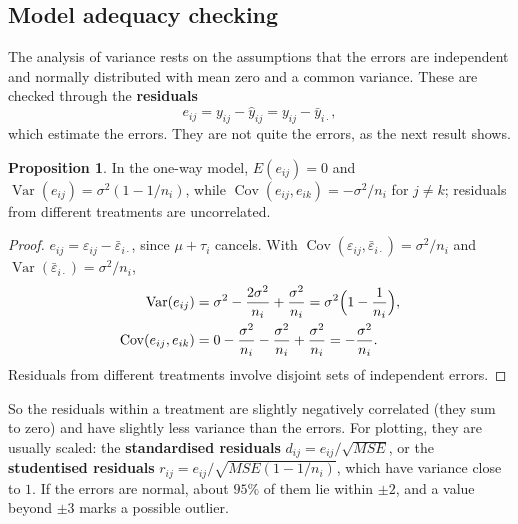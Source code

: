 \documentclass[11pt,a4paper]{article}
\numberwithin{equation}{section}
\DeclareMathOperator{\Var}{Var}
\DeclareMathOperator{\Cov}{Cov}
\theoremstyle{definition}
\newtheorem{prop}[thm]{Proposition}
\begin{document}
\subsection{Model adequacy checking}
The analysis of variance rests on the assumptions that the errors are independent and normally distributed with mean zero and a common
variance. These are checked through the \textbf{residuals}
\[
e_{ij} = y_{ij} - \hat y_{ij} = y_{ij} - \bar y_{i\cdot} ,
\]
which estimate the errors. They are not quite the errors, as the next result shows.

\begin{prop}\label{prop:residual-var}
In the one-way model, $E(e_{ij}) = 0$ and $\Var(e_{ij}) = \sigma^2(1 - 1/n_i)$, while $\Cov(e_{ij}, e_{ik}) = -\sigma^2/n_i$ for $j \ne k$; residuals from different treatments are
uncorrelated.
\end{prop}

\begin{proof}
$e_{ij} = \varepsilon_{ij} - \bar\varepsilon_{i\cdot}$, since $\mu + \tau_i$ cancels. With $\Cov(\varepsilon_{ij}, \bar\varepsilon_{i\cdot}) = \sigma^2/n_i$ and $\Var(\bar\varepsilon_{i\cdot}) = \sigma^2/n_i$,
\begin{align*}
\Var(e_{ij}) &= \sigma^2 - \frac{2\sigma^2}{n_i} + \frac{\sigma^2}{n_i} = \sigma^2\Bigl(1 - \frac{1}{n_i}\Bigr) , \\
\Cov(e_{ij}, e_{ik}) &= 0 - \frac{\sigma^2}{n_i} - \frac{\sigma^2}{n_i} + \frac{\sigma^2}{n_i} = -\frac{\sigma^2}{n_i} .
\end{align*}
Residuals from different treatments involve disjoint sets of independent errors.
\end{proof}

So the residuals within a treatment are slightly negatively correlated (they sum to zero) and have slightly less variance than the errors. For
plotting, they are usually scaled: the \textbf{standardised residuals} $d_{ij} = e_{ij}/\sqrt{MSE}$, or the \textbf{studentised residuals}
$r_{ij} = e_{ij}/\sqrt{MSE(1 - 1/n_i)}$, which have variance close to $1$. If the errors are normal, about $95\%$ of them lie within $\pm2$, and a value beyond $\pm3$
marks a possible outlier.
\end{document}
